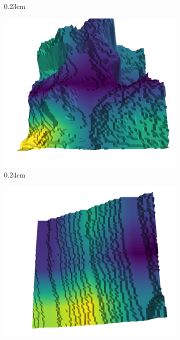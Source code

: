 \documentclass[../document.tex]{subfiles}
\begin{document}
\begin{figure}[H]
\begin{subfigure}[b]{0.242\linewidth}
            \caption{0.23cm}
            \end{subfigure}
            \begin{subfigure}[b]{0.242\linewidth}
            \includegraphics[width=\linewidth]{../img/5/quarry/false_positive/34-patch-3d-majavi-colormap-70.png}
            \caption{0.24cm}
            \end{subfigure}
            \begin{subfigure}[b]{0.242\linewidth}
            \includegraphics[width=\linewidth]{../img/5/quarry/false_positive/36-patch-3d-majavi-colormap-75.png}

\end{subfigure}
\end{figure}
\end{document}
